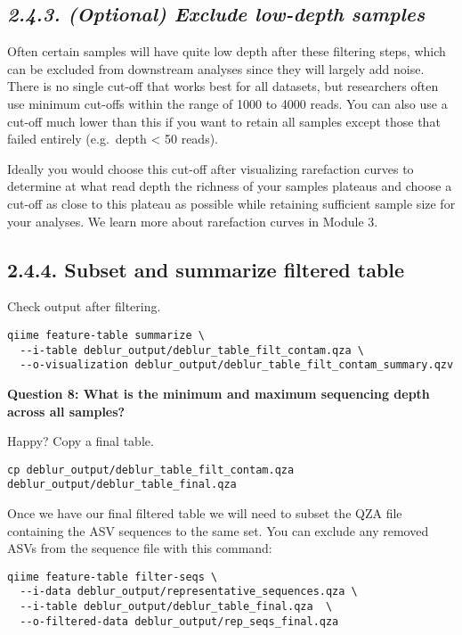 \documentclass[
]{book}
\begin{document}
\subsection{\texorpdfstring{\emph{2.4.3. (Optional) Exclude low-depth samples}}{2.4.3. (Optional) Exclude low-depth samples}}\label{optional-exclude-low-depth-samples-1}

Often certain samples will have quite low depth after these filtering steps, which can be excluded from downstream analyses since they will largely add noise. There is no single cut-off that works best for all datasets, but researchers often use minimum cut-offs within the range of 1000 to 4000 reads. You can also use a cut-off much lower than this if you want to retain all samples except those that failed entirely (e.g.~depth \textless{} 50 reads).

Ideally you would choose this cut-off after visualizing rarefaction curves to determine at what read depth the richness of your samples plateaus and choose a cut-off as close to this plateau as possible while retaining sufficient sample size for your analyses. We learn more about rarefaction curves in Module 3.

\subsection{2.4.4. Subset and summarize filtered table}\label{subset-and-summarize-filtered-table-1}

Check output after filtering.

\begin{verbatim}
qiime feature-table summarize \
  --i-table deblur_output/deblur_table_filt_contam.qza \
  --o-visualization deblur_output/deblur_table_filt_contam_summary.qzv
\end{verbatim}

\textbf{Question 8: What is the minimum and maximum sequencing depth across all samples?}

Happy? Copy a final table.

\begin{verbatim}
cp deblur_output/deblur_table_filt_contam.qza deblur_output/deblur_table_final.qza
\end{verbatim}

Once we have our final filtered table we will need to subset the QZA file containing the ASV sequences to the same set. You can exclude any removed ASVs from the sequence file with this command:

\begin{verbatim}
qiime feature-table filter-seqs \
  --i-data deblur_output/representative_sequences.qza \
  --i-table deblur_output/deblur_table_final.qza  \
  --o-filtered-data deblur_output/rep_seqs_final.qza
\end{verbatim}
\end{document}
